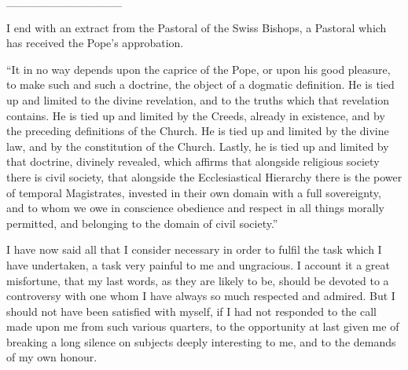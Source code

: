 \_\_\_\_\_\_\_\_\_\_\_\_\_\_

I end with an extract from the Pastoral of the Swiss Bishops, a
Pastoral which has received the Pope's approbation.

``It in no way depends upon the caprice of the Pope, or upon his
good pleasure, to make such and such a doctrine, the object of a
dogmatic definition. He is tied up and limited to the divine revelation,
and to the truths which that revelation contains. He is tied up and
limited by the Creeds, already in existence, and by the preceding
definitions of the Church. He is tied up and limited by the divine law,
and by the constitution of the Church. Lastly, he is tied up and limited
by that doctrine, divinely revealed, which affirms that alongside
religious society there is civil society, that alongside the Ecclesiastical Hierarchy there is the power of temporal Magistrates,
invested in their own domain with a full sovereignty, and to whom we owe
in conscience obedience and respect in all things morally permitted, and
belonging to the domain of civil society.''


I have now said all that I consider necessary in order to
fulfil the task which I have undertaken, a task very painful to me and
ungracious. I account it a great misfortune, that my last words, as they
are likely to be, should be devoted to a controversy with one whom I
have always so much respected and admired. But I should not have been
satisfied with myself, if I had not responded to the call made upon me
from such various quarters, to the opportunity at last given me of
breaking a long silence on subjects deeply interesting to me, and to the
demands of my own honour.

